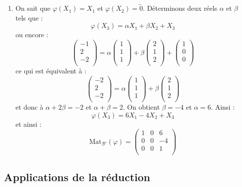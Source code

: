 \documentclass[a4paper,twoside,french,10pt]{VcCours}
\begin{document}
\begin{enumerate}
\item On sait que $\varphi(X_1)=X_1$ et $\varphi(X_2) = \tilde{0}$. Déterminons deux réels $\alpha$ et $\beta$ tels que :
$$ \varphi(X_3) = \alpha X_1 + \beta X_2 + X_3$$
ou encore :
$$ \begin{pmatrix}
-1 \\
2 \\
-2 \\
\end{pmatrix} = \alpha \begin{pmatrix}
1 \\
1 \\
1 \\
\end{pmatrix} + \beta \begin{pmatrix}
2 \\
1 \\
2 \\
\end{pmatrix} + \begin{pmatrix}
1 \\
0\\
0\\
\end{pmatrix}$$
ce qui est équivalent à :
$$  \begin{pmatrix}
-2 \\
2 \\
-2 \\
\end{pmatrix} = \alpha \begin{pmatrix}
1 \\
1 \\
1 \\
\end{pmatrix} + \beta \begin{pmatrix}
2 \\
1 \\
2 \\
\end{pmatrix} $$
et donc à $\alpha+ 2\beta =-2$ et $\alpha+ \beta = 2$. On obtient $\beta =-4$ et $\alpha =6$. Ainsi :
$$ \varphi(X_3) = 6 X_1 - 4 X_2 + X_3$$
et ainsi :
$$ \textrm{Mat}_{\mathcal{B}'}(\varphi) = \begin{pmatrix}
1 & 0 & 6 \\
0 & 0 & -4 \\
0 & 0 & 1 \\
\end{pmatrix}$$
\end{enumerate}


\subsection{Applications de la réduction}
\end{document}
